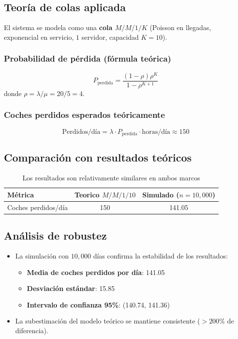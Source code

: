 \documentclass{article}
\begin{document}
\subsection{Teoría de colas aplicada}
El sistema se modela como una \textbf{cola \( M/M/1/K \)} (Poisson en llegadas, exponencial en servicio, \(1\) servidor, capacidad \(K=10\)).

\subsubsection{Probabilidad de pérdida (fórmula teórica)}
\[
P_{\text{perdida}} = \frac{(1 - \rho) \rho^K}{1 - \rho^{K+1}}
\]
donde \(\rho = \lambda / \mu = 20/5 = 4\).

\subsubsection{Coches perdidos esperados teóricamente}
\[
\text{Perdidos/día} = \lambda \cdot P_{\text{perdida}} \cdot \text{horas/día} \approx 150
\]
\subsection{Comparación con resultados teóricos}
\begin{table}[h]
    \centering
    \begin{tabular}{@{}lcc@{}}
        \toprule
        Métrica & Teorico \(M/M/1/10\) & Simulado (\(n=10,\!000\)) \\
        \midrule
        Coches perdidos/día & 150 & 141.05 \\
        \bottomrule
    \end{tabular}
    \caption{Los resultados son relativamente similares en ambos marcos}
\end{table}

\subsection{Análisis de robustez}
\begin{itemize}
    \item La simulación con \(10,\!000\) días confirma la estabilidad de los resultados:

    \begin{itemize}
        \item \textbf{Media de coches perdidos por día}: 141.05
        \item \textbf{Desviación estándar}: 15.85
        \item \textbf{Intervalo de confianza 95\%}: (140.74, 141.36)
    \end{itemize}

    \item La subestimación del modelo teórico se mantiene consistente (\(>200\%\) de diferencia).
\end{itemize}
\end{document}

